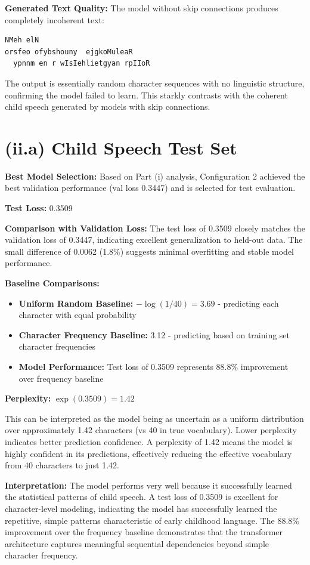 \documentclass[11pt]{article}
\begin{document}
\textbf{Generated Text Quality:} The model without skip connections produces completely incoherent text:
\begin{verbatim}
NMeh elN
orsfeo ofybshouny  ejgkoMuleaR
  ypnnm en r wIsIehlietgyan rpIIoR
\end{verbatim}
The output is essentially random character sequences with no linguistic structure, confirming the model failed to learn. This starkly contrasts with the coherent child speech generated by models with skip connections.

\section*{(ii.a) Child Speech Test Set}

\textbf{Best Model Selection:} Based on Part (i) analysis, Configuration 2 achieved the best validation performance (val loss 0.3447) and is selected for test evaluation.

\textbf{Test Loss:} 0.3509

\textbf{Comparison with Validation Loss:} The test loss of 0.3509 closely matches the validation loss of 0.3447, indicating excellent generalization to held-out data. The small difference of 0.0062 (1.8\%) suggests minimal overfitting and stable model performance.

\textbf{Baseline Comparisons:}
\begin{itemize}
    \item \textbf{Uniform Random Baseline:} $-\log(1/40) = 3.69$ - predicting each character with equal probability
    \item \textbf{Character Frequency Baseline:} 3.12 - predicting based on training set character frequencies
    \item \textbf{Model Performance:} Test loss of 0.3509 represents 88.8\% improvement over frequency baseline
\end{itemize}

\textbf{Perplexity:} $\exp(0.3509) = 1.42$

This can be interpreted as the model being as uncertain as a uniform distribution over approximately 1.42 characters (vs 40 in true vocabulary). Lower perplexity indicates better prediction confidence. A perplexity of 1.42 means the model is highly confident in its predictions, effectively reducing the effective vocabulary from 40 characters to just 1.42.

\textbf{Interpretation:} The model performs very well because it successfully learned the statistical patterns of child speech. A test loss of 0.3509 is excellent for character-level modeling, indicating the model has successfully learned the repetitive, simple patterns characteristic of early childhood language. The 88.8\% improvement over the frequency baseline demonstrates that the transformer architecture captures meaningful sequential dependencies beyond simple character frequency.
\end{document}
